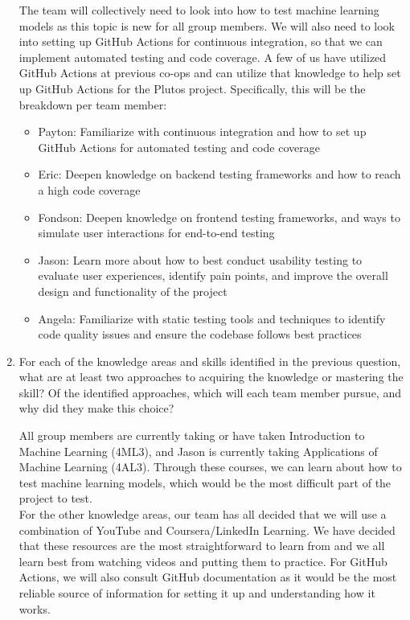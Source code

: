 \documentclass[12pt, titlepage]{article}
\begin{document}
\begin{enumerate}
The team will collectively need to look into how to test machine learning models
as this topic is new for all group members. We will also need to look into
setting up GitHub Actions for continuous integration, so that we can implement
automated testing and code coverage. A few of us have utilized GitHub Actions at
previous co-ops and can utilize that knowledge to help set up GitHub Actions for
the Plutos project. Specifically, this will be the breakdown per team member:\\
\begin{itemize}
	\item Payton: Familiarize with continuous integration and how to set up GitHub
	Actions for automated testing and code coverage
	\item Eric: Deepen knowledge on backend testing frameworks and how to reach
	a high code coverage
	\item Fondson: Deepen knowledge on frontend testing frameworks, and ways to
	simulate user interactions for end-to-end testing
	\item Jason: Learn more about how to best conduct usability testing to
	evaluate user experiences, identify pain points, and improve the overall
	design and functionality of the project
	\item Angela: Familiarize with static testing tools and techniques to
	identify code quality issues and ensure the codebase follows best practices
\end{itemize}

  \item For each of the knowledge areas and skills identified in the previous
  question, what are at least two approaches to acquiring the knowledge or
  mastering the skill?  Of the identified approaches, which will each team
  member pursue, and why did they make this choice?

All group members are currently taking or have taken Introduction to Machine
Learning (4ML3), and Jason is currently taking Applications of Machine Learning
(4AL3). Through these courses, we can learn about how to test machine learning
models, which would be the most difficult part of the project to test. \\
For the other knowledge areas, our team has all decided that we will use a
combination of YouTube and Coursera/LinkedIn Learning. We have decided that
these resources are the most straightforward to learn from and we all learn best
from watching videos and putting them to practice. For GitHub Actions, we will
also consult GitHub documentation as it would be the most reliable source of
information for setting it up and understanding how it works.


\end{enumerate}
\end{document}
